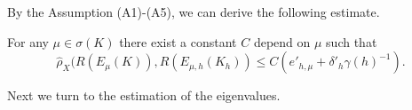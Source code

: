 \documentclass[leqno,CJK]{siamltex704}
\numberwithin{equation}{section}
\begin{document}
	
	By the Assumption (A1)-(A5), we can derive the following estimate.
	\begin{theorem}\label{thm-xnorm}
		For any $\mu\in\sigma(K)$ there exist a constant $C$ depend on $\mu$ such that
		\begin{equation*}
			\hat \rho_X(R(E_\mu(K)), R(E_{\mu,h}(K_h)) \le C(e'_{h,\mu}+\delta'_h\gamma(h)^{-1}).
		\end{equation*}
	\end{theorem}
	
	Next we turn to the estimation of the eigenvalues.

\end{document}
